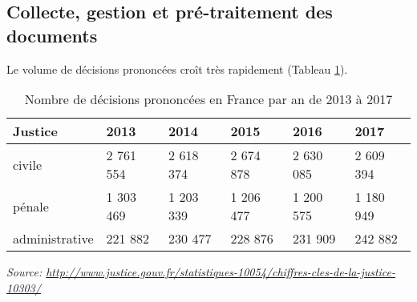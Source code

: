 \subsection{Collecte, gestion et pré-traitement des documents}

 Le volume de décisions prononcées croît très rapidement (Tableau \ref{tab:intro:nbdecisionstats}). 
 \begin{table}[!htb]
 	\small
 	\begin{center}
 		\begin{tabular}{|l|l|l|l|l|l|}
 			\hline
 			\textbf{Justice}	& \textbf{2013}      & \textbf{2014}      & \textbf{2015}      & \textbf{2016}      & \textbf{2017}      \\ \hline
 			civile         & 2 761 554 & 2 618 374 & 2 674 878 & 2 630 085 & 2 609 394 \\ \hline
 			pénale         & 1 303 469 & 1 203 339 & 1 206 477 & 1 200 575 & 1 180 949 \\ \hline
 			administrative & 221 882   & 230 477   & 228 876   & 231 909   & 242 882   \\ \hline
 		\end{tabular}
 		
 		\textit{\scriptsize{Source: \url{http://www.justice.gouv.fr/statistiques-10054/chiffres-cles-de-la-justice-10303/}}}  
 	\end{center}
 	\caption{Nombre de décisions prononcées en France par an de 2013 à 2017}\label{tab:intro:nbdecisionstats}
 \end{table}
